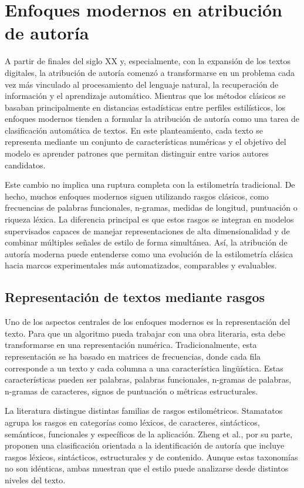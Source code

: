 \documentclass[IB]{TFUOC}%
\begin{document}
\section{Enfoques modernos en atribución de autoría}

A partir de finales del siglo XX y, especialmente, con la expansión de los textos digitales, la atribución de autoría comenzó a transformarse en un problema cada vez más vinculado al procesamiento del lenguaje natural, la recuperación de información y el aprendizaje automático. Mientras que los métodos clásicos se basaban principalmente en distancias estadísticas entre perfiles estilísticos, los enfoques modernos tienden a formular la atribución de autoría como una tarea de clasificación automática de textos\cite{stamatatos2009survey}. En este planteamiento, cada texto se representa mediante un conjunto de características numéricas y el objetivo del modelo es aprender patrones que permitan distinguir entre varios autores candidatos.

Este cambio no implica una ruptura completa con la estilometría tradicional. De hecho, muchos enfoques modernos siguen utilizando rasgos clásicos, como frecuencias de palabras funcionales, n-gramas, medidas de longitud, puntuación o riqueza léxica. La diferencia principal es que estos rasgos se integran en modelos supervisados capaces de manejar representaciones de alta dimensionalidad y de combinar múltiples señales de estilo de forma simultánea. Así, la atribución de autoría moderna puede entenderse como una evolución de la estilometría clásica hacia marcos experimentales más automatizados, comparables y evaluables.

\subsection{Representación de textos mediante rasgos}

Uno de los aspectos centrales de los enfoques modernos es la representación del texto. Para que un algoritmo pueda trabajar con una obra literaria, esta debe transformarse en una representación numérica. Tradicionalmente, esta representación se ha basado en matrices de frecuencias, donde cada fila corresponde a un texto y cada columna a una característica lingüística. Estas características pueden ser palabras, palabras funcionales, n-gramas de palabras, n-gramas de caracteres, signos de puntuación o métricas estructurales.

La literatura distingue distintas familias de rasgos estilométricos. Stamatatos agrupa los rasgos en categorías como léxicos, de caracteres, sintácticos, semánticos, funcionales y específicos de la aplicación\cite{stamatatos2009survey}. Zheng et al., por su parte, proponen una clasificación orientada a la identificación de autoría que incluye rasgos léxicos, sintácticos, estructurales y de contenido\cite{zheng2006framework}. Aunque estas taxonomías no son idénticas, ambas muestran que el estilo puede analizarse desde distintos niveles del texto.
\end{document}
